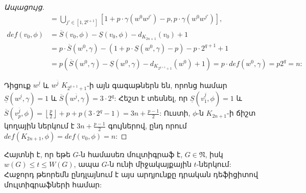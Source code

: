 \begin{proof}[Ապացույց]
\begin{align*}
    &= \bigcup\limits_{j'\in [1, 2^{q+1}]} {\left[ 1 + p\cdot\gamma(w^0w^{j'}) - p, p\cdot\gamma(w^0w^{j'}) \right]},\\
    def(v_0, \phi) &= \overline{S}(v_0, \phi) - \underline{S}(v_0, \phi)-d_{K_{2n+1}}(v_0) + 1\\
    &= p\cdot\overline{S}(w^0,\gamma) - (1 + p\cdot\underline{S}(w^0,\gamma) - p)-p\cdot2^{q+1} + 1\\
    &= p\left(\overline{S}(w^0,\gamma) - \underline{S}(w^0,\gamma)-d_{K_{2^{q+1}+1}}(w^0) + 1\right) = p\cdot def(w^0,\gamma) = p2^q = n:
\end{align*}

Դիցուք $w^{\underline{j}}$ և $w^{\overline{j}}$ $K_{2^{q+1}+1}$-ի այն գագաթներն են, որոնց համար $\underline{S}\left(w^{\underline{j}}, \gamma\right) = 1$ և $\overline{S}\left(w^{\overline{j}}, \gamma\right) = 3\cdot2^q$: Հեշտ է տեսնել, որ $\underline{S}\left(v^{\underline{j}}_{1},\phi\right) = 1$ և $\overline{S}\left(v^{\overline{j}}_{p},\phi\right) = \left\lfloor \frac{p}{2} \right\rfloor + p + p\left(3\cdot2^q - 1\right) = 3n + \frac{p-1}{2}$: Ուստի, $\phi$-ն $K_{2n+1}$-ի ճիշտ կողային ներկում է $3n + \frac{p-1}{2}$ գույներով, ընդ որում $def(K_{2n+1}, \phi) = def\left(v_0, \phi\right) = n$:
\end{proof}

Հայտնի է, որ եթե $G$-ն համասեռ մուլտիգրաֆ է, $G \in \mathfrak{N}$, իսկ $w(G) \leq t \leq W(G)$, ապա $G$-ն ունի միջակայքային $t$-ներկում: Հաջորդ թեորեմն ընդլայնում է այս արդյունքը դրական դեֆիցիտով մուլտիգրաֆների համար:

